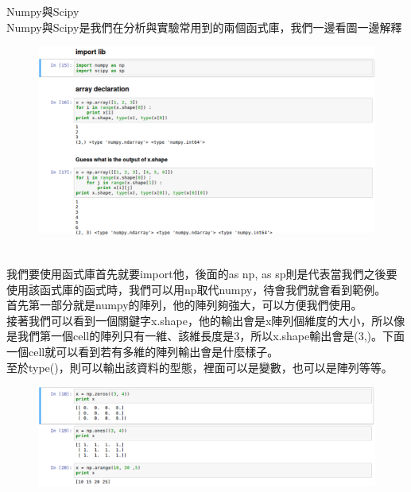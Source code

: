 \documentclass{article}
\begin{document}
\\\\Numpy與Scipy
\\Numpy與Scipy是我們在分析與實驗常用到的兩個函式庫，我們一邊看圖一邊解釋
\\
\begin{figure}[htp]
    \begin{center}
        \includegraphics[width=450pt]{pic/3_1_5.png}
    \end{center}
\end{figure}
\\
我們要使用函式庫首先就要import他，後面的as np, as sp則是代表當我們之後要使用該函式庫的函式時，我們可以用np取代numpy，待會我們就會看到範例。
\\首先第一部分就是numpy的陣列，他的陣列夠強大，可以方便我們使用。
\\接著我們可以看到一個關鍵字x.shape，他的輸出會是x陣列個維度的大小，所以像是我們第一個cell的陣列只有一維、該維長度是3，所以x.shape輸出會是(3,)。下面一個cell就可以看到若有多維的陣列輸出會是什麼樣子。
\\至於type()，則可以輸出該資料的型態，裡面可以是變數，也可以是陣列等等。
\\
\begin{figure}[htp]
    \begin{center}
        \includegraphics[width=450pt]{pic/3_1_6.png}
    \end{center}
\end{figure}
\end{document}
